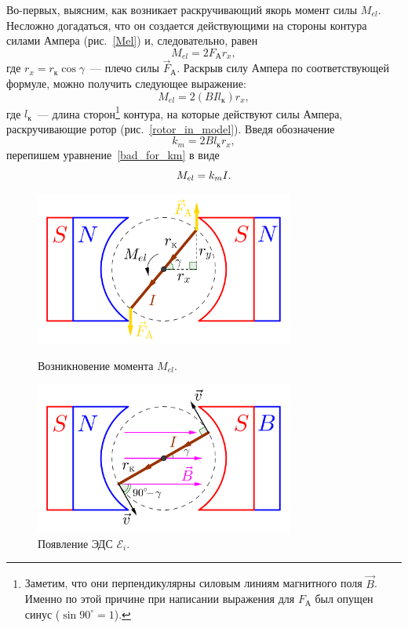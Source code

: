 \documentclass[12pt, a4paper, openany]{extarticle}
\begin{document}
Во-первых,  выясним, как возникает раскручивающий якорь момент силы $M_{el}$.
Несложно догадаться, что он создается действующими на стороны контура силами Ампера (рис.~\ref{Mel}) и, следовательно, равен
\begin{equation}
	M_{el} = 2F_\text{А}r_x,
\end{equation}   
где $r_x=r_\text{к}\cos\gamma$~--- плечо силы $\vec F_\text{А}$.
Раскрыв силу Ампера по соответствующей формуле, можно получить следующее выражение:
\begin{equation}\label{bad_for_km}
	M_{el} = 2(BIl_\text{к})r_x,
\end{equation}
где $l_\text{к}$~--- длина сторон\footnote{Заметим, что они перпендикулярны силовым линиям магнитного поля $\vec B$. Именно по этой причине при написании выражения для $F_\text{А}$ был опущен синус ($\sin 90^\circ = 1$).} контура, на которые действуют силы Ампера, раскручивающие ротор (рис.~\ref{rotor_in_model}).
Введя обозначение 
\begin{equation}\label{constr_const_km}
	k_m = 2Bl_\text{к}r_x,
\end{equation}
перепишем уравнение~\eqref{bad_for_km} в виде
\begin{equation}\label{for_km}
	M_{el} = k_mI\ldotp
\end{equation}

\begin{figure}[h]
	\begin{center}
		\begin{minipage}[h]{0.49\linewidth}
			\centering\includegraphics[height=5cm]{Mel.png}
			\caption{Возникновение момента $M_{el}$.}
			\label{Mel} 
		\end{minipage}
		\hfill 
		\begin{minipage}[h]{0.49\linewidth}
			\centering\includegraphics[height=5cm]{Ei.png}
			\caption{Появление ЭДС $\mathcal E_i$.}
			\label{Ei}
		\end{minipage}
	\end{center}
\end{figure}
\end{document}
